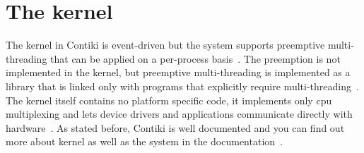
\section{The kernel}
The kernel in Contiki is event-driven but the system supports preemptive
multi-threading that can be applied on a per-process basis~\cite{video}.
The preemption is not implemented in the kernel, but
preemptive multi-threading is implemented as a library that is linked only with programs that
explicitly require multi-threading~\cite{paper-contiki}.
The kernel itself contains no platform specific code, it implements only cpu multiplexing and
lets device drivers and applications communicate directly with hardware~\cite{video}.
As stated before, Contiki is well documented and you can find out more about
kernel as well as the system in the documentation~\cite{contiki-docs}.
